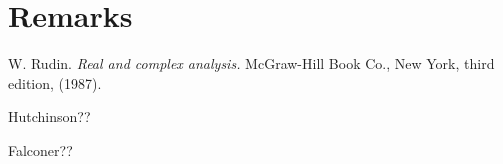 \documentclass[12pt,]{article}
\theoremstyle{definition}
\theoremstyle{remark}
\newcommand{\0}{\mathbf{0}}
\begin{document}
\section{Remarks}



\begin{thebibliography}{99}
  W. Rudin. 
  \textit{Real and complex analysis.}
  McGraw-Hill Book Co., New York, third edition, (1987).

  Hutchinson??

  Falconer??

\end{thebibliography}
\end{document}
